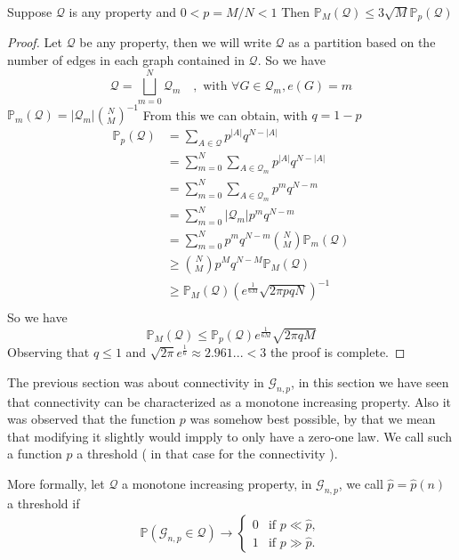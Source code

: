 \begin{theorem}
	Suppose $\mathcal{Q}$ is any property and $0 < p = M/N< 1$ 
	\newline
	Then $\mathbb{P}_M(\mathcal{Q}) \leq 3 \sqrt{M}\mathbb{P}_p(\mathcal{Q})$
\end{theorem}
\begin{proof}
	Let $\mathcal{Q}$ be any property, then we will write $\mathcal{Q}$ as a partition based on the number of edges in each graph contained in $\mathcal{Q}$.
	\newline
	So we have
	$$\mathcal{Q} = \bigsqcup_{m=0}^{N} \mathcal{Q}_m \quad, \text{ with } \forall G \in \mathcal{Q}_m, e(G) = m$$
	$\mathbb{P}_m(\mathcal{Q}) = |\mathcal{Q}_m| \binom{N}{M}^{-1}$
	From this we can obtain, with $q = 1 - p$
	\begin{align*}
		\mathbb{P}_p(\mathcal{Q})	&= \sum_{A \in \mathcal{Q}} p^{|A|}q^{N-|A|}\\
						&= \sum_{m=0}^{N}\sum_{A \in \mathcal{Q}_m} p^{|A|}q^{N-|A|}\\
						&= \sum_{m=0}^{N}\sum_{A \in \mathcal{Q}_m} p^{m}q^{N-m}\\
						&= \sum_{m=0}^{N}|\mathcal{Q}_m|p^{m}q^{N-m}\\
						&= \sum_{m=0}^N p^mq^{N-m}\binom{N}{M}\mathbb{P}_m(\mathcal{Q}) \\
						&\geq \binom{N}{M}p^Mq^{N-M}\mathbb{P}_M(\mathcal{Q}) \\
						&\geq \mathbb{P}_M(\mathcal{Q})(e^{\frac{1}{6M}}\sqrt{2\pi p q N})^{-1}\\
	\end{align*}
	So we have
	\begin{equation}
		\mathbb{P}_M(\mathcal{Q}) \leq  \mathbb{P}_p(\mathcal{Q})e^{\frac{1}{6M}}\sqrt{2\pi q M}
	\end{equation}
	Observing that $q \leq 1$ and $\sqrt{2\pi}e^{\frac{1}{6}} \approx 2.961... < 3$ the proof is complete.
\end{proof}
The previous section was about connectivity in $\mathcal{G}_{n,p}$, in this section we have seen that connectivity can be characterized as a monotone increasing property.
Also it was observed that the function $p$ was somehow best possible, by that we mean that modifying it slightly would impply to only have a zero-one law. 
We call such a function $p$ a threshold ( in that case for the connectivity ). 
\newline

More formally, let $\mathcal{Q}$ a monotone increasing property,  in $\mathcal{G}_{n, p}$, we call $\hat{p} = \hat{p}(n)$ a threshold if
\begin{align}
	\mathbb{P}(\mathcal{G}_{n,p} \in \mathcal{Q}) \rightarrow \left\{\begin{array}{rl}
										0 & \text{if } p \ll \hat{p},\\
										1 & \text{if } p \gg \hat{p}.
									 \end{array}
									\right.
\end{align}

